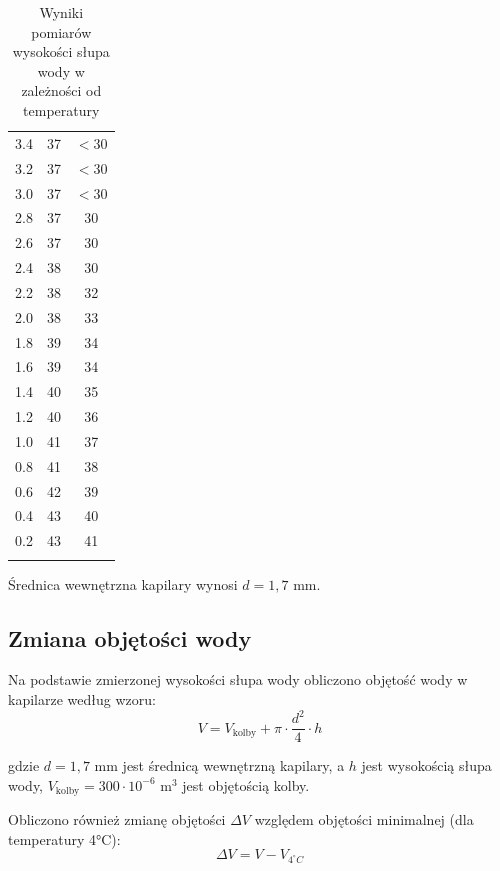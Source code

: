 \documentclass[a4paper,12pt]{article}
\begin{document}
\begin{longtable}{|c|c|c|}
    3.4  & 37 & $<30$ \\
    3.2  & 37 & $<30$ \\
    3.0  & 37 & $<30$ \\
    2.8  & 37 & 30 \\
    2.6  & 37 & 30 \\
    2.4  & 38 & 30 \\
    2.2  & 38 & 32 \\
    2.0  & 38 & 33 \\
    1.8  & 39 & 34 \\
    1.6  & 39 & 34 \\
    1.4  & 40 & 35 \\
    1.2  & 40 & 36 \\
    1.0  & 41 & 37 \\
    0.8  & 41 & 38 \\
    0.6  & 42 & 39 \\
    0.4  & 43 & 40 \\
    0.2  & 43 & 41 \\
    \hline
    \caption{Wyniki pomiarów wysokości słupa wody w zależności od temperatury}
    \label{tab:pomiary_wysokosci}
\end{longtable}

Średnica wewnętrzna kapilary wynosi $d = 1{,}7 $ mm.

\subsection{Zmiana objętości wody}

Na podstawie zmierzonej wysokości słupa wody obliczono objętość wody w kapilarze według wzoru:
\begin{equation}
    V = V_{\text{kolby}} +\pi \cdot \frac{d^2}{4} \cdot h
\end{equation}

gdzie $d = 1,7$ mm jest średnicą wewnętrzną kapilary, a $h$ jest wysokością słupa wody, $V_{\text{kolby}} = 300 \cdot 10^{-6} \text{ m}^3$ jest objętością kolby.

Obliczono również zmianę objętości $\Delta V$ względem objętości minimalnej (dla temperatury 4°C):
\begin{equation}
    \Delta V = V - V_{4^\circ C}
\end{equation}
\end{document}
